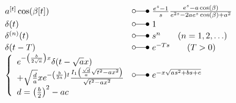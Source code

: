 \[\begin{array}{@{}l@{ ~ \laplace ~ }l@{}}
a^{[t]} \cos(\beta [t]) &
    \frac{e^s - 1}{s} \frac{e^s - a \cos(\beta)}{e^{2s} - 2 a e^s \cos(\beta) + a^2} \\
\delta(t) &
    1 \\
\delta^{(n)}(t) &
    s^n \qquad (n = 1, 2, \ldots) \\
\delta(t - T) &
    e^{-Ts} \qquad (T > 0) \\
\left\lbrace\begin{array}{l}
e^{-\left(\frac{b}{2 \sqrt{a}}\right) x} \delta(t - \sqrt{a} x) \\
+ \sqrt{\frac{d}{a}} x e^{-\left(\frac{b}{2a}\right) t} \frac{I_1 \left(\frac{\sqrt{d}}{a} \sqrt{t^2 - a x^2}\right)}{\sqrt{t^2 - a x^2}} \\
d = \left(\frac{b}{2}\right)^2 - a c \\
\end{array}\right. &
    e^{-x \sqrt{as^2 + bs + c}} \\
\end{array} \]

